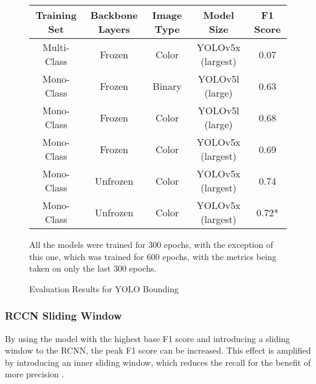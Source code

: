 \begin{figure}[H]
    \caption{Evaluation Results for YOLO Bounding}
    \label{fig:evalYOLORaw}
    \begin{center}
      \begin{tabular}{ | c | c | c | c | c | }
          \hline
          Training Set & Backbone Layers & Image Type & Model Size & F1 Score \\
          \hline
          Multi-Class & Frozen & Color & YOLOv5x (largest) & 0.07 \\
          Mono-Class & Frozen & Binary & YOLOv5l (large) & 0.63 \\
          Mono-Class & Frozen & Color & YOLOv5l (large) & 0.68 \\
          Mono-Class & Frozen & Color & YOLOv5x (largest) & 0.69 \\
          Mono-Class & Unfrozen & Color & YOLOv5x (largest) & 0.74 \\
          Mono-Class & Unfrozen & Color & YOLOv5x (largest) & 0.72* \\
          \hline
      \end{tabular}
    \end{center}
    \vspace{5mm}
    All the models were trained for 300 epochs, with the exception of this one, which was trained for 600 epochs, with the metrics being taken on only the last 300 epochs.
\end{figure}

\subsubsection{RCCN Sliding Window}

By using the model with the highest base F1 score and introducing a sliding window to the RCNN, the peak F1 score can be increased. This effect is amplified by introducing an inner sliding window, which reduces the recall for the benefit of more precision .

